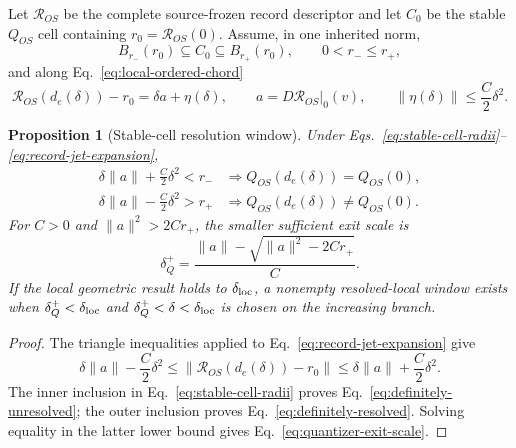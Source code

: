 \documentclass[11pt]{article}
\newtheorem{proposition}{Proposition}
\begin{document}
Let $\mathcal R_{OS}$ be the complete source-frozen record descriptor and let
$C_0$ be the stable $Q_{OS}$ cell containing
$r_0=\mathcal R_{OS}(0)$.  Assume, in one inherited norm,
\begin{equation}
 B_{r_-}(r_0)\subseteq C_0\subseteq B_{r_+}(r_0),
 \qquad 0<r_-\le r_+,
 \label{eq:stable-cell-radii}
\end{equation}
and along Eq.~\eqref{eq:local-ordered-chord}
\begin{equation}
 \mathcal R_{OS}(d_e(\delta))-r_0
 =\delta a+\eta(\delta),
 \qquad
 a=D\mathcal R_{OS}|_0(v),
 \qquad
 \lVert\eta(\delta)\rVert\le \frac{C}{2}\delta^2.
 \label{eq:record-jet-expansion}
\end{equation}

\begin{proposition}[Stable-cell resolution window]
\label{prop:stable-cell-window}
Under Eqs.~\eqref{eq:stable-cell-radii}--\eqref{eq:record-jet-expansion},
\begin{align}
 \delta\lVert a\rVert+\frac{C}{2}\delta^2<r_-
 &\Longrightarrow Q_{OS}(d_e(\delta))=Q_{OS}(0),
 \label{eq:definitely-unresolved}\\
 \delta\lVert a\rVert-\frac{C}{2}\delta^2>r_+
 &\Longrightarrow Q_{OS}(d_e(\delta))\ne Q_{OS}(0).
 \label{eq:definitely-resolved}
\end{align}
For $C>0$ and $\lVert a\rVert^2>2Cr_+$, the smaller sufficient exit scale is
\begin{equation}
 \delta_Q^+
 =\frac{\lVert a\rVert-\sqrt{\lVert a\rVert^2-2Cr_+}}{C}.
 \label{eq:quantizer-exit-scale}
\end{equation}
If the local geometric result holds to $\delta_{\rm loc}$, a nonempty
resolved-local window exists when $\delta_Q^+<\delta_{\rm loc}$ and
$\delta_Q^+<\delta<\delta_{\rm loc}$ is chosen on the increasing branch.
\end{proposition}

\begin{proof}
The triangle inequalities applied to
Eq.~\eqref{eq:record-jet-expansion} give
\[
 \delta\lVert a\rVert-\frac{C}{2}\delta^2
 \le\lVert\mathcal R_{OS}(d_e(\delta))-r_0\rVert
 \le\delta\lVert a\rVert+\frac{C}{2}\delta^2.
\]
The inner inclusion in Eq.~\eqref{eq:stable-cell-radii} proves
Eq.~\eqref{eq:definitely-unresolved}; the outer inclusion proves
Eq.~\eqref{eq:definitely-resolved}.  Solving equality in the latter lower
bound gives Eq.~\eqref{eq:quantizer-exit-scale}.
\end{proof}
\end{document}
